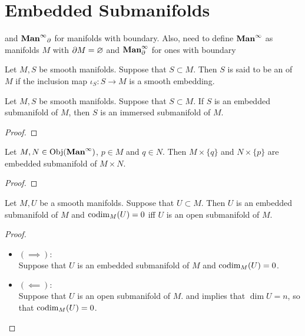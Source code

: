 \documentclass{book}
\begin{document}
	
	

	
	
	
	
	
	
	
	
	
	\newpage
	\section{Embedded Submanifolds}
	
	 and $\operatorname*{\text{\textbf{Man}}^{\infty}}_{\partial}$ for manifolds with boundary. Also, need to define $\operatorname*{\text{\textbf{Man}}^{\infty}}$ as manifolds $M$ with $\partial M = \varnothing$ and $\operatorname*{\text{\textbf{Man}}^{\infty}_{\partial}}$ for ones with boundary

	\begin{defn}
		Let $M, S$ be smooth manifolds. Suppose that $S \subset M$. Then $S$ is said to be an  of $M$ if the inclusion map $\iota_S:S \rightarrow M$ is a smooth embedding.
	\end{defn}

	\begin{ex}
		Let $M, S$ be smooth manifolds. Suppose that $S \subset M$. If $S$ is an embedded submanifold of $M$, then $S$ is an immersed submanifold of $M$.
	\end{ex}

	\begin{proof}
	\end{proof}

	\begin{ex}
		Let $M, N \in \operatorname{Obj}(\operatorname*{\text{\textbf{Man}}^{\infty}})$, $p \in M$ and $q \in N$. Then $M \times \{q\}$ and $N \times \{p\}$ are embedded submanifold of $M \times N$. 
	\end{ex}

	\begin{proof}
	\end{proof}

	\begin{ex}
		Let $M, U$ be a smooth manifolds. Suppose that $U \subset M$. Then $U$ is an embedded submanifold of $M$ and $\operatorname{codim}_M(U) = 0$ iff $U$ is an open submanifold of $M$. 
	\end{ex}

	\begin{proof}\
		\begin{itemize}
			\item $(\implies):$ \\
			Suppose that $U$ is an embedded submanifold of $M$ and $\operatorname{codim}_M(U) = 0$. 
			\item $(\impliedby):$ \\
			Suppose that $U$ is an open submanifold of $M$.   and  implies that $\dim U = n$, so that $\operatorname{codim}_M(U) = 0$.
		\end{itemize}
	\end{proof}
\end{document}
